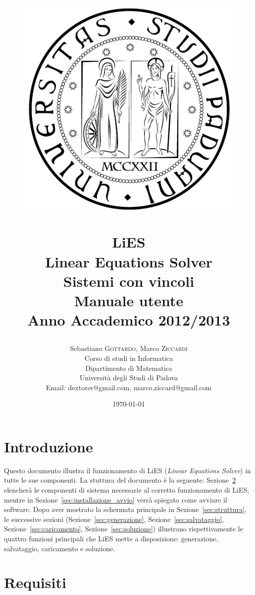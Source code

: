 \documentclass{article}
\title{
\begin{figure}[ht]
\begin{center}
\includegraphics[scale=0.6]{./common-images/unipd_logo.pdf}
\end{center}
\end{figure}
LiES \\ Linear Equations Solver \\ Sistemi con vincoli \\\vspace{10mm} \textbf{Manuale utente}\\\vspace{0.4cm}
\Large{Anno Accademico 2012/2013}}
\author{Sebastiano \textsc{Gottardo}, Marco \textsc{Ziccardi}\\
Corso di studi in Informatica\\
Dipartimento di Matematica\\
Università degli Studi di Padova\\
Email: dextorer@gmail.com, marco.ziccard@gmail.com }
\date{\today} %
\begin{document}
\maketitle %



\newpage
\tableofcontents
\newpage


\section{Introduzione}
\label{sec:introduzione}

Questo documento illustra il funzionamento di LiES (\textit{Linear Equations Solver}) in tutte le sue componenti. La stuttura del documento è la seguente: Sezione~\ref{sec:requisiti} elencherà le componenti di sistema necessarie al corretto funzionamento di LiES, mentre in Sezione~\ref{sec:installazione_avvio} verrà spiegato come avviare il software. Dopo aver mostrato la schermata principale in Sezione~\ref{sec:struttura}, le successive sezioni (Sezione~\ref{sec:generazione}, Sezione~\ref{sec:salvataggio}, Sezione~\ref{sec:caricamento}, Sezione~\ref{sec:soluzione}) illustrano rispettivamente le quattro funzioni principali che LiES mette a disposizione: generazione, salvataggio, caricamento e soluzione.


\section{Requisiti}
\label{sec:requisiti}
\end{document}
